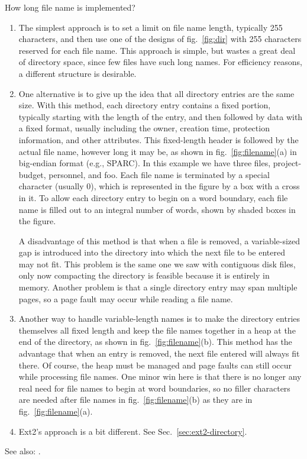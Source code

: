 How long file name is implemented?
\begin{enumerate}
\item The simplest approach is to set a limit on file name length, typically 255
  characters, and then use one of the designs of fig.~\ref{fig:dir} with 255 characters
  reserved for each file name. This approach is simple, but wastes a great deal of
  directory space, since few files have such long names. For efficiency reasons, a
  different structure is desirable.
\item One alternative is to give up the idea that all directory entries are the same
  size. With this method, each directory entry contains a fixed portion, typically
  starting with the length of the entry, and then followed by data with a fixed format,
  usually including the owner, creation time, protection information, and other
  attributes. This fixed-length header is followed by the actual file name, however long
  it may be, as shown in fig.~\ref{fig:filename}(a) in big-endian format (e.g., SPARC). In
  this example we have three files, project-budget, personnel, and foo. Each file name is
  terminated by a special character (usually 0), which is represented in the figure by a
  box with a cross in it. To allow each directory entry to begin on a word boundary, each
  file name is filled out to an integral number of words, shown by shaded boxes in the
  figure.

  A disadvantage of this method is that when a file is removed, a variable-sized gap is
  introduced into the directory into which the next file to be entered may not fit. This
  problem is the same one we saw with contiguous disk files, only now compacting the
  directory is feasible because it is entirely in memory. Another problem is that a single
  directory entry may span multiple pages, so a page fault may occur while reading a file
  name.
\item Another way to handle variable-length names is to make the directory entries
  themselves all fixed length and keep the file names together in a heap at the end of the
  directory, as shown in fig.~\ref{fig:filename}(b). This method has the advantage that
  when an entry is removed, the next file entered will always fit there. Of course, the
  heap must be managed and page faults can still occur while processing file names. One
  minor win here is that there is no longer any real need for file names to begin at word
  boundaries, so no filler characters are needed after file names in
  fig.~\ref{fig:filename}(b) as they are in fig.~\ref{fig:filename}(a).
\item Ext2's approach is a bit different. See Sec.~\ref{sec:ext2-directory}.
\end{enumerate}
See also: .


